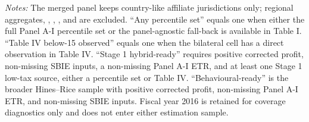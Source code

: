 \begin{table}[H]
\centering
\caption{Coverage of the merged bilateral base panel by fiscal year}
\label{tab:base_panel_coverage_working}
\small
{}

\vspace{0.5em}
\begin{minipage}{0.93\textwidth}
\footnotesize \textit{Notes:} The merged panel keeps country-like affiliate jurisdictions only; regional aggregates, , , , and  are excluded. ``Any percentile set'' equals one when either the full Panel A-I percentile set or the panel-agnostic  fall-back is available in Table I. ``Table IV below-15 observed'' equals one when the bilateral cell has a direct  observation in Table IV. ``Stage 1 hybrid-ready'' requires positive corrected profit, non-missing SBIE inputs, a non-missing Panel A-I ETR, and at least one Stage 1 low-tax source, either a percentile set or Table IV. ``Behavioural-ready'' is the broader Hines--Rice sample with positive corrected profit, non-missing Panel A-I ETR, and non-missing SBIE inputs. Fiscal year 2016 is retained for coverage diagnostics only and does not enter either estimation sample.
\end{minipage}
\end{table}

